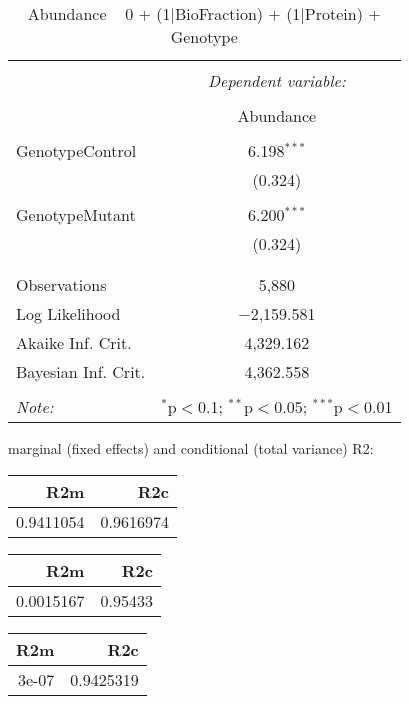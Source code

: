 \documentclass[11pt]{report}
\begin{document}
\begin{table}[!htbp] \centering 
  \caption{Abundance ~ 0 + (1|BioFraction) + (1|Protein) + Genotype} 
  \label{} 
\begin{tabular}{@{\extracolsep{5pt}}lc} 
\\[-1.8ex]\hline 
\hline \\[-1.8ex] 
 & \multicolumn{1}{c}{\textit{Dependent variable:}} \\ 
\cline{2-2} 
\\[-1.8ex] & Abundance \\ 
\hline \\[-1.8ex] 
 GenotypeControl & 6.198$^{***}$ \\ 
  & (0.324) \\ 
  & \\ 
 GenotypeMutant & 6.200$^{***}$ \\ 
  & (0.324) \\ 
  & \\ 
\hline \\[-1.8ex] 
Observations & 5,880 \\ 
Log Likelihood & $-$2,159.581 \\ 
Akaike Inf. Crit. & 4,329.162 \\ 
Bayesian Inf. Crit. & 4,362.558 \\ 
\hline 
\hline \\[-1.8ex] 
\textit{Note:}  & \multicolumn{1}{r}{$^{*}$p$<$0.1; $^{**}$p$<$0.05; $^{***}$p$<$0.01} \\ 
\end{tabular} 
\end{table} 
marginal (fixed effects) and conditional (total variance) R2:

\begin{tabular}{r|r}
\hline
R2m & R2c\\
\hline
0.9411054 & 0.9616974\\
\hline
\end{tabular}

\begin{tabular}{r|r}
\hline
R2m & R2c\\
\hline
0.0015167 & 0.95433\\
\hline
\end{tabular}

\begin{tabular}{r|r}
\hline
R2m & R2c\\
\hline
3e-07 & 0.9425319\\
\hline
\end{tabular}
\end{document}
